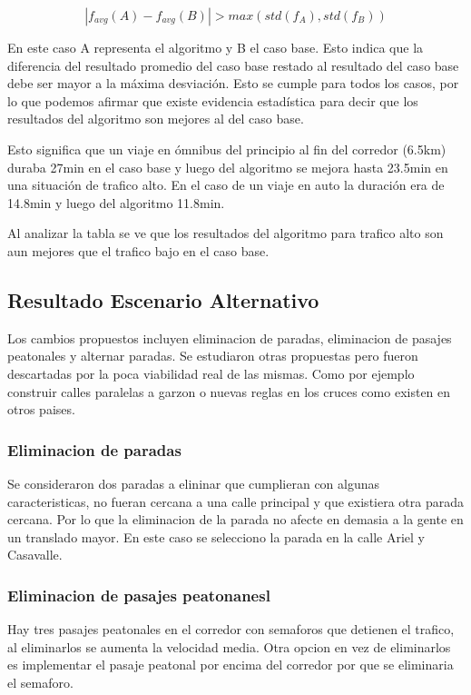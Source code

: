 \begin{equation}
\label{eq:funcion_significancia}
\left |f_{avg}(A) - f_{avg}(B)  \right | > max(std(f_A),std(f_B))
\end{equation}

En este caso A representa el algoritmo y B el caso base. Esto indica que la diferencia del resultado promedio del caso base restado al resultado del caso base debe ser mayor a la máxima desviación.
Esto se cumple para todos los casos, por lo que podemos afirmar que existe evidencia estadística para decir que los resultados del algoritmo son mejores al del caso base.


Esto significa que un viaje en ómnibus del principio al fin del corredor (6.5km) duraba 27min en el caso base y luego del algoritmo se mejora hasta 23.5min en una situación de trafico alto. En el caso de un viaje en auto la duración era de 14.8min y luego del algoritmo 11.8min.

Al analizar la tabla se ve que los resultados del algoritmo para trafico alto son aun mejores que el trafico bajo en el caso base. 





\subsection{Resultado Escenario Alternativo}
Los cambios propuestos incluyen eliminacion de paradas, eliminacion de pasajes peatonales y alternar paradas. Se estudiaron otras propuestas pero fueron descartadas por la poca viabilidad real de las mismas. Como por ejemplo construir calles paralelas a garzon o nuevas reglas en los cruces como existen en otros paises.




\subsubsection{Eliminacion de paradas}
Se consideraron dos paradas a elininar que cumplieran con algunas caracteristicas, no fueran cercana a una calle principal y que existiera otra parada cercana. Por lo que la eliminacion de la parada no afecte en demasia a la gente en un translado mayor.
En este caso se selecciono la parada en la calle Ariel y Casavalle.



\subsubsection{Eliminacion de pasajes peatonanesl}
Hay tres pasajes peatonales en el corredor con semaforos que detienen el trafico, al eliminarlos se aumenta la velocidad media. Otra opcion en vez de eliminarlos es implementar el pasaje peatonal por encima del corredor por que se eliminaria el semaforo.

